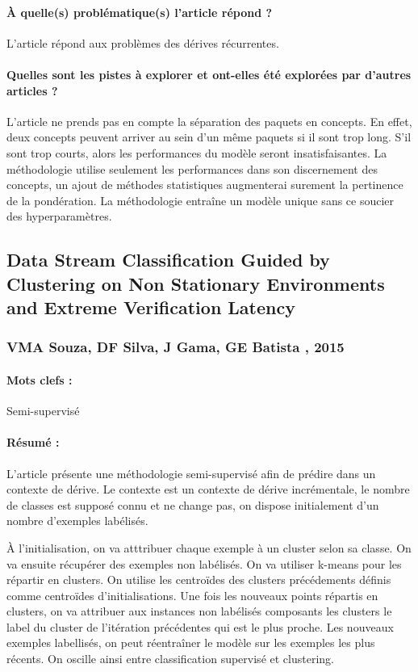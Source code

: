\documentclass[11pt,a4paper]{report}
\begin{document}
\paragraph{À quelle(s) problématique(s) l'article répond ?} L'article répond aux problèmes des dérives récurrentes.

\paragraph{Quelles sont les pistes à explorer et ont-elles été explorées par d'autres articles ?} L'article ne prends pas en compte la séparation des paquets en concepts. En effet, deux concepts peuvent arriver au sein d'un même paquets si il sont trop long. S'il sont trop courts, alors les performances du modèle seront insatisfaisantes. La méthodologie utilise seulement les performances dans son discernement des concepts, un ajout de méthodes statistiques augmenterai surement la pertinence de la pondération. La méthodologie entraîne un modèle unique sans ce soucier des hyperparamètres.




\subsection{Data Stream Classification Guided by Clustering on Non Stationary Environments and Extreme Verification Latency}
\subsubsection{VMA Souza, DF Silva, J Gama, GE Batista , 2015}

\paragraph{Mots clefs :} Semi-supervisé

\paragraph{Résumé :} L'article présente une méthodologie semi-supervisé afin de prédire dans un contexte de dérive. Le contexte est un contexte de dérive incrémentale, le nombre de classes est supposé connu et ne change pas, on dispose initialement d'un nombre d'exemples labélisés.

 À l'initialisation, on va atttribuer chaque exemple à un cluster selon sa classe. On va ensuite récupérer des exemples non labélisés. On va utiliser k-means pour les répartir en clusters. On utilise les centroïdes des clusters précédements définis comme centroïdes d'initialisations. Une fois les nouveaux points répartis en clusters, on va attribuer aux instances non labélisés composants les clusters le label du cluster de l'itération précédentes qui est le plus proche. Les nouveaux exemples labellisés, on peut réentraîner le modèle sur les exemples les plus récents.  On oscille ainsi entre classification supervisé et clustering.
\end{document}
